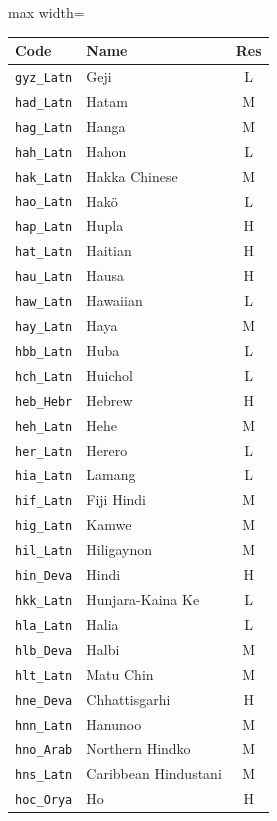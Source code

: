 {\begin{adjustbox}{max width=\textwidth}
\begin{tabular}{llc}
        \toprule
        \textbf{Code} & \textbf{Name} & \textbf{Res}\\
        \midrule
        \texttt{gyz\_Latn} & Geji & L \\
        \texttt{had\_Latn} & Hatam & M \\
        \texttt{hag\_Latn} & Hanga & M \\
        \texttt{hah\_Latn} & Hahon & L \\
        \texttt{hak\_Latn} & Hakka Chinese & M \\
        \texttt{hao\_Latn} & Hakö & L \\
        \texttt{hap\_Latn} & Hupla & H \\
        \texttt{hat\_Latn} & Haitian & H \\
        \texttt{hau\_Latn} & Hausa & H \\
        \texttt{haw\_Latn} & Hawaiian & L \\
        \texttt{hay\_Latn} & Haya & M \\
        \texttt{hbb\_Latn} & Huba & L \\
        \texttt{hch\_Latn} & Huichol & L \\
        \texttt{heb\_Hebr} & Hebrew & H \\
        \texttt{heh\_Latn} & Hehe & M \\
        \texttt{her\_Latn} & Herero & L \\
        \texttt{hia\_Latn} & Lamang & L \\
        \texttt{hif\_Latn} & Fiji Hindi & M \\
        \texttt{hig\_Latn} & Kamwe & M \\
        \texttt{hil\_Latn} & Hiligaynon & M \\
        \texttt{hin\_Deva} & Hindi & H \\
        \texttt{hkk\_Latn} & Hunjara-Kaina Ke & L \\
        \texttt{hla\_Latn} & Halia & L \\
        \texttt{hlb\_Deva} & Halbi & M \\
        \texttt{hlt\_Latn} & Matu Chin & M \\
        \texttt{hne\_Deva} & Chhattisgarhi & H \\
        \texttt{hnn\_Latn} & Hanunoo & M \\
        \texttt{hno\_Arab} & Northern Hindko & M \\
        \texttt{hns\_Latn} & Caribbean Hindustani & M \\
        \texttt{hoc\_Orya} & Ho & H \\

\end{tabular}
\end{adjustbox}}

